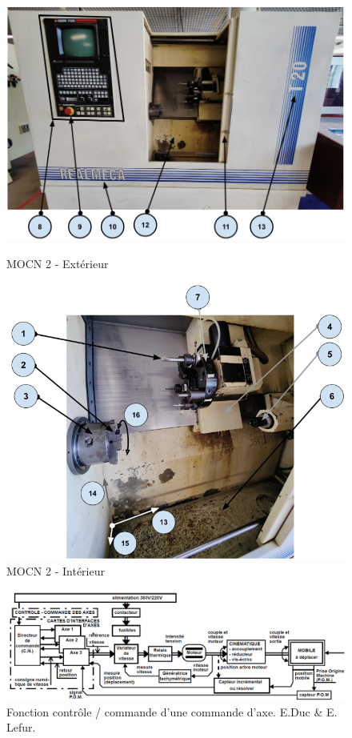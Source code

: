 \documentclass[12pt]{article}
\begin{document}
\begin{figure}
\centering
\includegraphics[width=0.75\linewidth]{MOCN21.PNG}
\caption{MOCN 2 - Extérieur}
\label{MOCN21}


\centering
\includegraphics[width=0.75\linewidth]{MOCN22.PNG}
\caption{MOCN 2 - Intérieur}
\label{MOCN22}
\end{figure}


\begin{figure}
\centering
\includegraphics[width=1\linewidth]{fonction1.PNG}
\caption{Fonction contrôle / commande d’une commande d’axe. E.Duc \& E. Lefur.}
\label{F1}
\end{figure}
\end{document}
